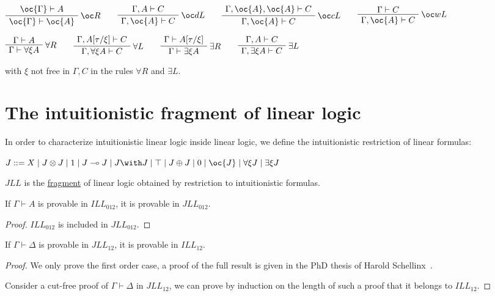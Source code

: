 \(\AxRule{\oc{\Gamma}\vdash A}
\LabelRule{\oc R}
\UnaRule{\oc{\Gamma}\vdash\oc{A}}
\DisplayProof
\qquad
\AxRule{\Gamma,A\vdash C}
\LabelRule{\oc d L}
\UnaRule{\Gamma,\oc{A}\vdash C}
\DisplayProof
\qquad
\AxRule{\Gamma,\oc{A},\oc{A}\vdash C}
\LabelRule{\oc c L}
\UnaRule{\Gamma,\oc{A}\vdash C}
\DisplayProof
\qquad
\AxRule{\Gamma\vdash C}
\LabelRule{\oc w L}
\UnaRule{\Gamma,\oc{A}\vdash C}
\DisplayProof\)

\(\AxRule{\Gamma\vdash A}
\LabelRule{\forall R}
\UnaRule{\Gamma\vdash \forall\xi A}
\DisplayProof
\qquad
\AxRule{\Gamma,A[\tau/\xi]\vdash C}
\LabelRule{\forall L}
\UnaRule{\Gamma,\forall\xi A\vdash C}
\DisplayProof
\qquad
\AxRule{\Gamma\vdash A[\tau/\xi]}
\LabelRule{\exists R}
\UnaRule{\Gamma\vdash\exists\xi A}
\DisplayProof
\qquad
\AxRule{\Gamma,A\vdash C}
\LabelRule{\exists L}
\UnaRule{\Gamma,\exists\xi A\vdash C}
\DisplayProof\)

with \(\xi\) not free in \(\Gamma,C\) in the rules \(\forall R\) and
\(\exists L\).

\section{The intuitionistic fragment of linear logic}\label{the-intuitionistic-fragment-of-linear-logic}

In order to characterize intuitionistic linear logic inside linear
logic, we define the intuitionistic restriction of linear formulas:

\(J ::= X \mid J\tens J \mid \one \mid J\limp J \mid J\with J \mid \top \mid J\plus J \mid \zero \mid \oc{J} \mid \forall\xi J \mid \exists\xi J\)

\(JLL\) is the \hyperref[fragment]{fragment} of linear logic obtained by restriction to
intuitionistic formulas.

\begin{proposition}
If $\Gamma\vdash A$ is provable in $ILL_{012}$, it is provable in $JLL_{012}$.
\end{proposition}

\begin{proof}
$ILL_{012}$ is included in $JLL_{012}$.
\end{proof}

\begin{theorem}
If $\Gamma\vdash\Delta$ is provable in $JLL_{12}$, it is provable in $ILL_{12}$.
\end{theorem}

\begin{proof}
We only prove the first order case, a proof of the full result is given in the PhD thesis of Harold Schellinx~\cite{phdschellinx}.

Consider a cut-free proof of $\Gamma\vdash\Delta$ in $JLL_{12}$, we can prove by induction on the length of such a proof that it belongs to $ILL_{12}$.
\end{proof}

